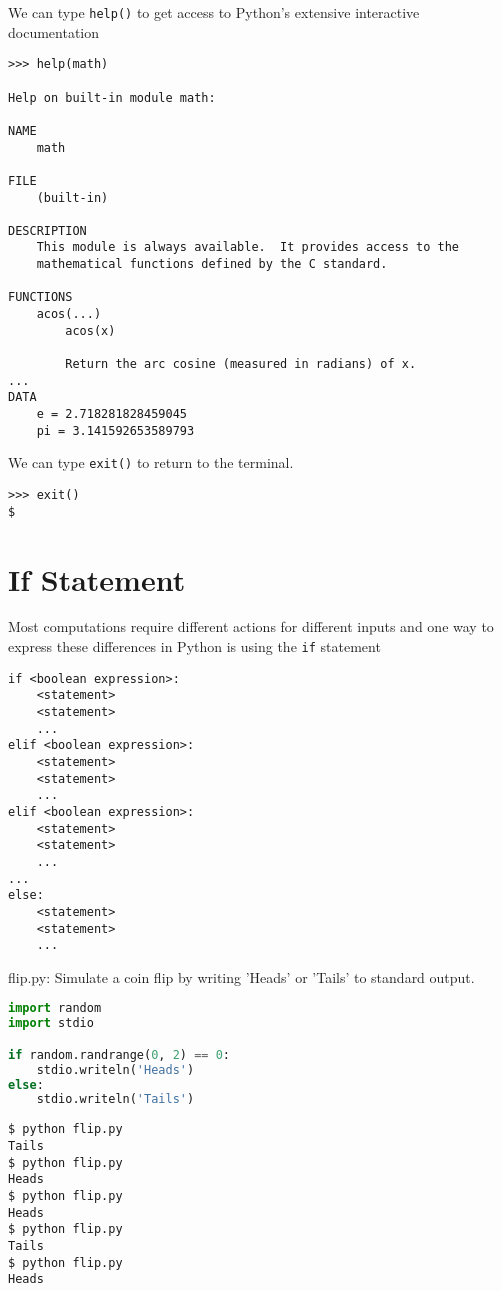 \documentclass[8pt,a4paper,compress]{beamer}
\begin{document}
\begin{frame}[fragile]
We can type \lstinline{help()} to get access to Python's extensive interactive documentation
\begin{lstlisting}[language={}]
>>> help(math)

Help on built-in module math:

NAME
    math

FILE
    (built-in)

DESCRIPTION
    This module is always available.  It provides access to the
    mathematical functions defined by the C standard.

FUNCTIONS
    acos(...)
        acos(x)
        
        Return the arc cosine (measured in radians) of x.
...
DATA
    e = 2.718281828459045
    pi = 3.141592653589793
\end{lstlisting}

\bigskip

We can type \lstinline{exit()} to return to the terminal.
\begin{lstlisting}[language={}]
>>> exit()
$
\end{lstlisting}
\end{frame}

\section{If Statement}
\begin{frame}[fragile]
Most computations require different actions for different inputs and one way to express these differences in Python is using the \lstinline{if} statement

\smallskip

\begin{lstlisting}[language={}]
if <boolean expression>:
    <statement>
    <statement>
    ...
elif <boolean expression>:
    <statement>
    <statement>
    ...
elif <boolean expression>:
    <statement>
    <statement>
    ...
...
else: 
    <statement>
    <statement>
    ...
\end{lstlisting}
\end{frame}

\begin{frame}[fragile]
\begin{framed}
\tiny flip.py: Simulate a coin flip by writing 'Heads' or 'Tails' to standard output.
\end{framed}

\begin{lstlisting}[language=Python]
import random
import stdio

if random.randrange(0, 2) == 0:
    stdio.writeln('Heads')
else:
    stdio.writeln('Tails')
\end{lstlisting}

\begin{lstlisting}[language={}]
$ python flip.py 
Tails
$ python flip.py 
Heads
$ python flip.py 
Heads
$ python flip.py 
Tails
$ python flip.py 
Heads
\end{lstlisting}
\end{frame}
\end{document}
